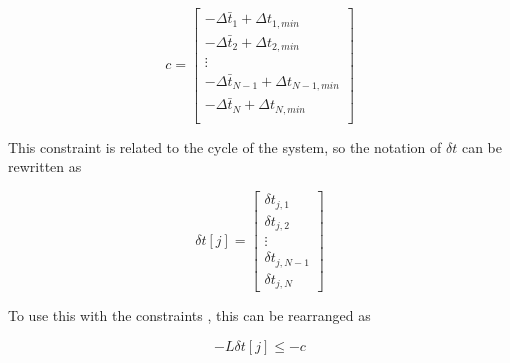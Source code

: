 \begin{equation}
    c = \left[
    \begin{matrix}
        -\Delta \bar{t}_1 + \Delta t_{1,min} \\
        -\Delta \bar{t}_2 + \Delta t_{2,min} \\
        \vdots \\
        -\Delta \bar{t}_{N-1} + \Delta t_{N-1,min} \\
        -\Delta \bar{t}_{N} + \Delta t_{N,min} \\
    \end{matrix}
    \right]
\end{equation}


This constraint is related to the  cycle of the system, so the notation of $\delta t$ can be rewritten as

\begin{equation}
    \delta t[j] = 
    \left[
        \begin{matrix}
            \delta t_{j,1} \\
            \delta t_{j,2} \\
            \vdots \\
            \delta t_{j,N-1} \\
            \delta t_{j,N}
        \end{matrix}
    \right]
\end{equation}

\noindent
To use this with the constraints , this can be rearranged as

\begin{equation*}
    -L \delta t[j] \le -c
\end{equation*}